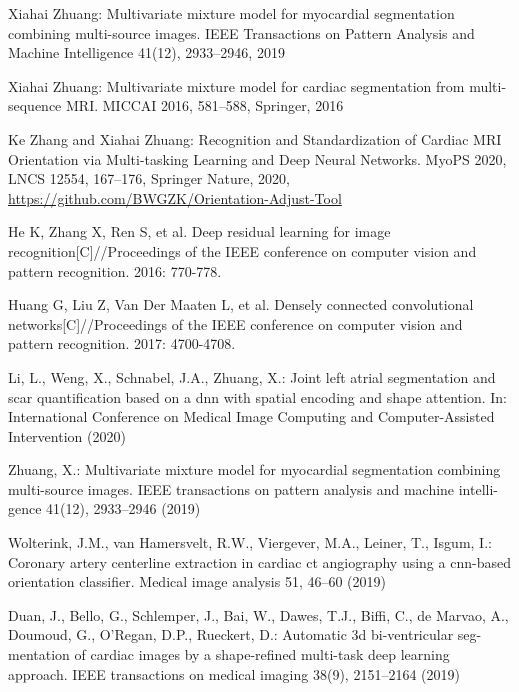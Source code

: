 \documentclass[runningheads]{llncs}
\begin{document}
\begin{thebibliography}{8}
Xiahai Zhuang: Multivariate mixture model for myocardial segmentation combining multi-source images. IEEE Transactions on Pattern Analysis and Machine Intelligence 41(12), 2933–2946, 2019

Xiahai Zhuang: Multivariate mixture model for cardiac segmentation from multi-sequence MRI. MICCAI 2016, 581–588, Springer, 2016 

Ke Zhang and Xiahai Zhuang: Recognition and Standardization of Cardiac MRI Orientation via Multi-tasking Learning and Deep Neural Networks. MyoPS 2020, LNCS 12554, 167–176, Springer Nature, 2020, \url{https://github.com/BWGZK/Orientation-Adjust-Tool}

He K, Zhang X, Ren S, et al. Deep residual learning for image recognition[C]//Proceedings of the IEEE conference on computer vision and pattern recognition. 2016: 770-778.

Huang G, Liu Z, Van Der Maaten L, et al. Densely connected convolutional networks[C]//Proceedings of the IEEE conference on computer vision and pattern recognition. 2017: 4700-4708.

Li, L., Weng, X., Schnabel, J.A., Zhuang, X.: Joint left atrial segmentation and scar quantification based on a dnn with spatial encoding and shape attention. In: International Conference on Medical Image Computing and Computer-Assisted Intervention (2020)

Zhuang, X.: Multivariate mixture model for myocardial segmentation combining multi-source images. IEEE transactions on pattern analysis and machine intelli- gence 41(12), 2933–2946 (2019)

Wolterink, J.M., van Hamersvelt, R.W., Viergever, M.A., Leiner, T., Isgum, I.: Coronary artery centerline extraction in cardiac ct angiography using a cnn-based orientation classifier. Medical image analysis 51, 46–60 (2019)

Duan, J., Bello, G., Schlemper, J., Bai, W., Dawes, T.J., Biffi, C., de Marvao, A., Doumoud, G., O’Regan, D.P., Rueckert, D.: Automatic 3d bi-ventricular seg- mentation of cardiac images by a shape-refined multi-task deep learning approach. IEEE transactions on medical imaging 38(9), 2151–2164 (2019)


\end{thebibliography}
\end{document}
